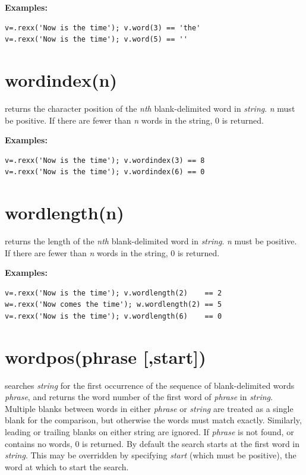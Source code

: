 \textbf{Examples:}
\begin{lstlisting}
v=.rexx('Now is the time'); v.word(3) == 'the'
v=.rexx('Now is the time'); v.word(5) == ''
\end{lstlisting}

\section{wordindex(n)}\label{refwordind}
returns the character position of the \emph{n}\emph{th}
blank-delimited word in \emph{string}.
\emph{n} must be positive.
If there are fewer than \emph{n} words in the string, 0 is returned.
 
\textbf{Examples:}
\begin{lstlisting}
v=.rexx('Now is the time'); v.wordindex(3) == 8
v=.rexx('Now is the time'); v.wordindex(6) == 0
\end{lstlisting}

\section{wordlength(n)}\label{refwordlen}
returns the length of the \emph{n}\emph{th} blank-delimited word in
\emph{string}.
\emph{n} must be positive.
If there are fewer than \emph{n} words in the string, 0 is returned.
 
\textbf{Examples:}
\begin{lstlisting}
v=.rexx('Now is the time'); v.wordlength(2)    == 2
w=.rexx('Now comes the time'); w.wordlength(2) == 5
v=.rexx('Now is the time'); v.wordlength(6)    == 0
\end{lstlisting}

\section{wordpos(phrase [,start{]})}\label{refwordpos}
searches \emph{string} for the first occurrence of the sequence
of blank-delimited words \emph{phrase}, and returns the word number
of the first word of \emph{phrase} in \emph{string}.  Multiple
blanks between words in either \emph{phrase} or \emph{string}
are treated as a single blank for the comparison, but otherwise the
words must match exactly.  Similarly, leading or trailing blanks on
either string are ignored.
If \emph{phrase} is not found, or contains no words, 0 is returned.
 By default the search starts at the first word in \emph{string}.
This may be overridden by specifying \emph{start} (which must be
positive), the word at which to start the search.
 
